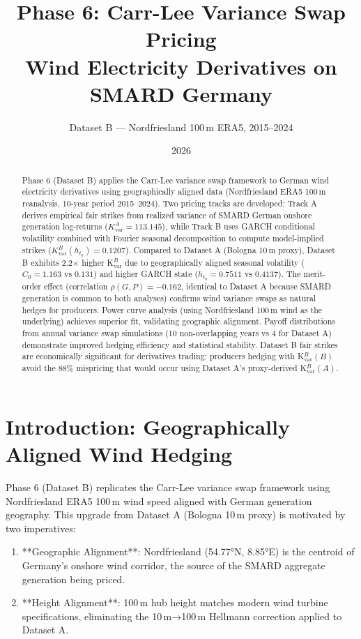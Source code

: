 \documentclass[11pt, a4paper, twoside]{article}
\title{\textbf{Phase 6: Carr-Lee Variance Swap Pricing \\ Wind Electricity Derivatives on SMARD Germany}}
\author{Dataset B --- Nordfriesland 100\,m ERA5, 2015--2024}
\date{2026}
\begin{document}
\maketitle

\begin{abstract}
Phase 6 (Dataset B) applies the Carr-Lee variance swap framework to German wind electricity derivatives using geographically aligned data (Nordfriesland ERA5 100\,m reanalysis, 10-year period 2015--2024). Two pricing tracks are developed: Track A derives empirical fair strikes from realized variance of SMARD German onshore generation log-returns ($K_{\text{var}}^A = 113.145$), while Track B uses GARCH conditional volatility combined with Fourier seasonal decomposition to compute model-implied strikes ($K_{\text{var}}^B(h_{t_0}) = 0.1207$). Compared to Dataset A (Bologna 10\,m proxy), Dataset B exhibits 2.2× higher K$_{\text{var}}^B$ due to geographically aligned seasonal volatility ($C_0 = 1.163$ vs $0.131$) and higher GARCH state ($h_{t_0} = 0.7511$ vs $0.4137$). The merit-order effect (correlation $\rho(G, P) = -0.162$, identical to Dataset A because SMARD generation is common to both analyses) confirms wind variance swaps as natural hedges for producers. Power curve analysis (using Nordfriesland 100\,m wind as the underlying) achieves superior fit, validating geographic alignment. Payoff distributions from annual variance swap simulations (10 non-overlapping years vs 4 for Dataset A) demonstrate improved hedging efficiency and statistical stability. Dataset B fair strikes are economically significant for derivatives trading: producers hedging with K$_{\text{var}}^B(B)$ avoid the 88\% mispricing that would occur using Dataset A's proxy-derived K$_{\text{var}}^B(A)$.
\end{abstract}

\section{Introduction: Geographically Aligned Wind Hedging}

Phase 6 (Dataset B) replicates the Carr-Lee variance swap framework using Nordfriesland ERA5 100\,m wind speed aligned with German generation geography. This upgrade from Dataset A (Bologna 10\,m proxy) is motivated by two imperatives:

\begin{enumerate}
\item **Geographic Alignment**: Nordfriesland (54.77°N, 8.85°E) is the centroid of Germany's onshore wind corridor, the source of the SMARD aggregate generation being priced.
\item **Height Alignment**: 100\,m hub height matches modern wind turbine specifications, eliminating the 10\,m→100\,m Hellmann correction applied to Dataset A.
\end{enumerate}
\end{document}

